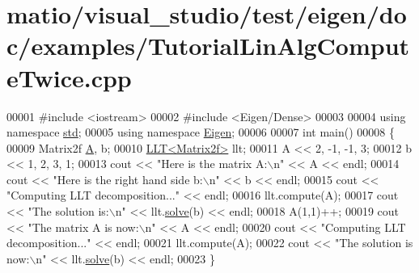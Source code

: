 \hypertarget{matio_2visual__studio_2test_2eigen_2doc_2examples_2_tutorial_lin_alg_compute_twice_8cpp_source}{}\section{matio/visual\+\_\+studio/test/eigen/doc/examples/\+Tutorial\+Lin\+Alg\+Compute\+Twice.cpp}
\label{matio_2visual__studio_2test_2eigen_2doc_2examples_2_tutorial_lin_alg_compute_twice_8cpp_source}

\begin{DoxyCode}
00001 \textcolor{preprocessor}{#include <iostream>}
00002 \textcolor{preprocessor}{#include <Eigen/Dense>}
00003 
00004 \textcolor{keyword}{using namespace }\hyperlink{namespacestd}{std};
00005 \textcolor{keyword}{using namespace }\hyperlink{namespace_eigen}{Eigen};
00006 
00007 \textcolor{keywordtype}{int} main()
00008 \{
00009    Matrix2f \hyperlink{group___core___module_class_eigen_1_1_matrix}{A}, b;
00010    \hyperlink{group___cholesky___module_class_eigen_1_1_l_l_t}{LLT<Matrix2f>} llt;
00011    A << 2, -1, -1, 3;
00012    b << 1, 2, 3, 1;
00013    cout << \textcolor{stringliteral}{"Here is the matrix A:\(\backslash\)n"} << A << endl;
00014    cout << \textcolor{stringliteral}{"Here is the right hand side b:\(\backslash\)n"} << b << endl;
00015    cout << \textcolor{stringliteral}{"Computing LLT decomposition..."} << endl;
00016    llt.compute(A);
00017    cout << \textcolor{stringliteral}{"The solution is:\(\backslash\)n"} << llt.\hyperlink{group___cholesky___module_a3738bb3ce6f9b837a2beb432b937499f}{solve}(b) << endl;
00018    A(1,1)++;
00019    cout << \textcolor{stringliteral}{"The matrix A is now:\(\backslash\)n"} << A << endl;
00020    cout << \textcolor{stringliteral}{"Computing LLT decomposition..."} << endl;
00021    llt.compute(A);
00022    cout << \textcolor{stringliteral}{"The solution is now:\(\backslash\)n"} << llt.\hyperlink{group___cholesky___module_a3738bb3ce6f9b837a2beb432b937499f}{solve}(b) << endl;
00023 \}
\end{DoxyCode}
